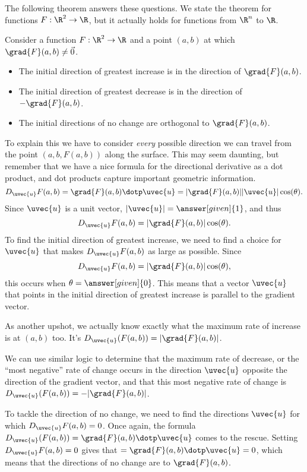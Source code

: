 \documentclass{ximera}
\begin{document}
The following theorem answers these questions. We state the theorem
for functions $F:\R^2\to\R$, but it actually holds for functions from
$\R^n$ to $\R$.

\begin{theorem}
Consider a function $F:\R^2 \to \R$ and a point $(a,b)$ at which
$\grad{F}(a,b) \neq \vec{0}$.
\begin{itemize}
\item The initial direction of greatest increase is in the direction
  of $\grad{F}(a,b)$.
\item The initial direction of greatest decrease is in the direction
  of $-\grad{F}(a,b)$.
\item The initial directions of no change are orthogonal to
  $\grad{F}(a,b)$.
\end{itemize}
\begin{explanation}
  To explain this we have to consider \emph{every} possible direction
  we can travel from the point $(a,b,F(a,b))$ along the surface. This
  may seem daunting, but remember that we have a nice formula for the
  directional derivative as a dot product, and dot products capture
  important geometric information.
  \[
  D_{\uvec{u}} F(a,b) = \grad{F}(a,b) \dotp \uvec{u} =
  |\grad{F}(a,b)||\uvec{u}|\cos(\theta).
  \]
  Since $\uvec{u}$ is a unit vector, $|\uvec{u}|=\answer[given]{1}$, and thus
  \[
  D_{\uvec{u}} F(a,b) = |\grad{F}(a,b)|\cos(\theta).
  \]
  To find the initial direction of greatest increase, we need to find
  a choice for $\uvec{u}$ that makes $D_{\uvec{u}} F(a,b)$ as large as
  possible. Since
  \[
  D_{\uvec{u}} F(a,b) = |\grad{F}(a,b)|\cos(\theta),
  \]
  this occurs when $\theta=\answer[given]{0}$. This means that a
  vector $\uvec{u}$ that points in the initial direction of greatest
  increase is parallel to the gradient vector.

  As another upshot, we actually know exactly what the maximum rate of
  increase is at $(a,b)$ too. It's $D_{\uvec{u}}(F(a,b)) =
  |\grad{F}(a,b)|$.

  We can use similar logic to determine that the maximum rate of
  decrease, or the ``most negative'' rate of change occurs in the
  direction $\uvec{u}$ opposite the direction of the gradient vector,
  and that this most negative rate of change is $D_{\uvec{u}}(F(a,b))
  = -|\grad{F}(a,b)|$.

  To tackle the direction of no change, we need to find the directions
  $\uvec{u}$ for which $D_{\uvec{u}} F(a,b) =0$. Once again, the formula
  $D_{\uvec{u}}(F(a,b)) = \grad{F}(a,b) \dotp \uvec{u}$ comes to the
  rescue. Setting $D_{\uvec{u}} F(a,b) =0$ gives that $= \grad{F}(a,b)
  \dotp \uvec{u} = 0$, which means that the directions of no change are
   to
  $\grad{F}(a,b)$.
\end{explanation}
\end{theorem}
\end{document}
